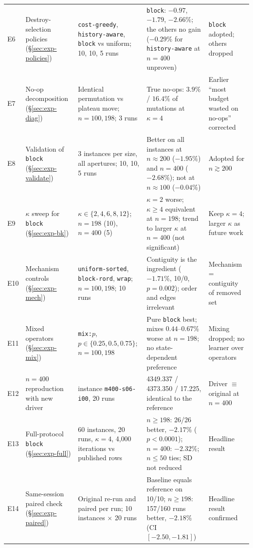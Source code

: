 {\begin{longtable}{P{0.7cm}P{3.0cm}P{3.5cm}P{4.2cm}P{2.9cm}}
E6 & Destroy-selection policies (\S\ref{sec:exp-policies}) & \texttt{cost-greedy}, \texttt{history-aware}, \texttt{block} vs uniform; 10, 10, 5 runs & \texttt{block}: $-0.97$, $-1.79$, $-2.66\%$; the others no gain ($-0.29\%$ for \texttt{history-aware} at $n=400$ unproven) & \texttt{block} adopted; others dropped\\
E7 & No-op decomposition (\S\ref{sec:exp-diag}) & Identical permutation vs plateau move; $n=100,198$; 3 runs & True no-ops: $3.9\%$ / $16.4\%$ of mutations at $\kappa=4$ & Earlier \enquote{most budget wasted on no-ops} corrected\\
E8 & Validation of \texttt{block} (\S\ref{sec:exp-validate}) & 3 instances per size, all apertures; 10, 10, 5 runs & Better on all instances at $n\approx200$ ($-1.95\%$) and $n=400$ ($-2.68\%$); not at $n\approx100$ ($-0.04\%$) & Adopted for $n\gtrsim200$\\
E9 & $\kappa$ sweep for \texttt{block} (\S\ref{sec:exp-bk}) & $\kappa\in\{2,4,6,8,12\}$; $n=198$ (10), $n=400$ (5) & $\kappa=2$ worse; $\kappa\ge4$ equivalent at $n=198$; trend to larger $\kappa$ at $n=400$ (not significant) & Keep $\kappa=4$; larger $\kappa$ as future work\\
E10 & Mechanism controls (\S\ref{sec:exp-mech}) & \texttt{uniform-sorted}, \texttt{block-rord}, \texttt{wrap}; $n=100,198$; 10 runs & Contiguity is the ingredient ($-1.71\%$, 10/0, $p=0.002$); order and edges irrelevant & Mechanism = contiguity of removed set\\
E11 & Mixed operators (\S\ref{sec:exp-mix}) & \texttt{mix:}$p$, $p\in\{0.25,0.5,0.75\}$; $n=100,198$ & Pure \texttt{block} best; mixes $0.44$--$0.67\%$ worse at $n=198$; no state-dependent preference & Mixing dropped; no learner over operators\\
E12 & $n=400$ reproduction with new driver & instance \texttt{m400-s06-i00}, 20 runs & 4349.337 / 4373.350 / 17.225, identical to the reference & Driver $\equiv$ original at $n=400$\\
E13 & Full-protocol \texttt{block} (\S\ref{sec:exp-full}) & 60 instances, 20 runs, $\kappa=4$, 4{,}000 iterations vs published rows & $n\ge198$: 26/26 better, $-2.17\%$ ($p<0.0001$); $n=400$: $-2.32\%$; $n\le50$ ties; SD not reduced & Headline result\\
E14 & Same-session paired check (\S\ref{sec:exp-paired}) & Original re-run and paired per run; 10 instances $\times$ 20 runs & Baseline equals reference on 10/10; $n\ge198$: 157/160 runs better, $-2.18\%$ (CI $[-2.50,-1.81]$) & Headline result confirmed\\
\end{longtable}
}

